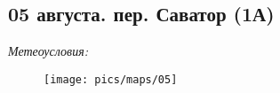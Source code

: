 \subsection{05 августа. пер. Саватор (1А)}
\textit{Метеоусловия: }

\begin{figure}[h!]
	\centering
	\texttt{[image: pics/maps/05]}
	\label{fig:05}
\end{figure}



\clearpage